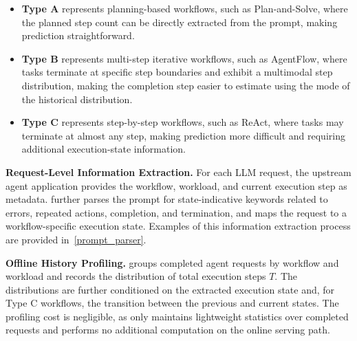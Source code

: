 \begin{itemize}[leftmargin=10pt]\label{type-describe}
    \item \textbf{Type A} represents planning-based workflows, such as Plan-and-Solve, where the planned step count can be directly extracted from the prompt, making prediction straightforward.
    \item \textbf{Type B} represents multi-step iterative workflows, such as AgentFlow, where tasks terminate at specific step boundaries and exhibit a multimodal step distribution, making the completion step easier to estimate using the mode of the historical distribution.
    \item \textbf{Type C} represents step-by-step workflows, such as ReAct, where tasks may terminate at almost any step, making prediction more difficult and requiring additional execution-state information.
\end{itemize}



\textbf{Request-Level Information Extraction.}
For each LLM request, the upstream agent application provides the workflow, workload, and current execution step as metadata. 
\sysname further parses the prompt for state-indicative keywords related to errors, repeated actions, completion, and termination, and maps the request to a workflow-specific execution state.
Examples of this information extraction process are provided in~\autoref{prompt_parser}.

\textbf{Offline History Profiling.}
\sysname groups completed agent requests by workflow and workload and records the distribution of total execution steps $T$. 
The distributions are further conditioned on the extracted execution state and, for Type C workflows, the transition between the previous and current states.
The profiling cost is negligible, as \sysname only maintains lightweight statistics over completed requests and performs no additional computation on the online serving path.


